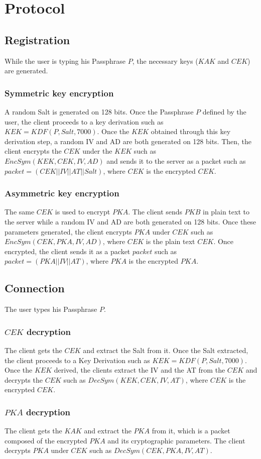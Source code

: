 \documentclass[a4paper,10pt]{article}
\begin{document}
\section{Protocol}
\subsection{Registration}
While the user is typing his Passphrase $P$, the necessary keys ($KAK$ and $CEK$) are generated.
\subsubsection{Symmetric key encryption}
A random Salt is generated on 128 bits. Once the Passphrase $P$ defined by the user, the client proceeds to a key derivation such as $KEK=KDF(P,Salt, 7000)$. Once the $KEK$ obtained through this key derivation step, a random IV and AD are both generated on 128 bits. Then, the client encrypts the $CEK$ under the $KEK$ such as $EncSym(KEK, CEK,IV,AD)$ and sends it to the server as a packet such as $packet=(CEK||IV||AT||Salt)$, where $CEK$ is the encrypted $CEK$.
\subsubsection{Asymmetric key encryption}
The same $CEK$ is used to encrypt $PKA$. The client sends $PKB$ in plain text to the server while a random IV and AD are both generated on 128 bits. Once these parameters generated, the client encrypts $PKA$ under $CEK$ such as $EncSym(CEK, PKA, IV, AD)$, where $CEK$ is the plain text $CEK$. Once encrypted, the client sends it as a packet $packet$ such as $packet=(PKA||IV||AT)$, where $PKA$ is the encrypted $PKA$.

\subsection{Connection}
The user types his Passphrase $P$.

\subsubsection{$CEK$ decryption}
The client gets the $CEK$ and extract the Salt from it. Once the Salt extracted, the client proceeds to a Key Derivation such as $KEK=KDF(P,Salt,7000)$. Once the $KEK$ derived, the clients extract the IV and the AT from the $CEK$ and decrypts the $CEK$ such as $DecSym(KEK,CEK,IV,AT)$, where $CEK$ is the encrypted $CEK$.
\subsubsection{$PKA$ decryption}
The client gets the $KAK$ and extract the $PKA$ from it, which is a packet composed of the encrypted $PKA$ and its cryptographic parameters. The client decrypts $PKA$ under $CEK$ such as $DecSym(CEK, PKA, IV,AT)$.
\end{document}
